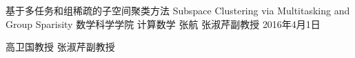 \documentclass[oneside]{fduthesis}%
\begin{document}
%
{基于多任务和组稀疏的子空间聚类方法}%
{Subspace Clustering via Multitasking and Group Sparisity}%
{数学科学学院}%
{计算数学}%
{张\hspace{1em}航}%
{张淑芹\hspace{1.5em}副教授}%
{2016年4月1日}

%
{高卫国\hspace{1.5em}教\hspace{1em}授}
{张淑芹\hspace{1.5em}副教授}

\frontmatter
\tableofcontents


\mainmatter







%

\backmatter



\makebackcover
\end{document}
